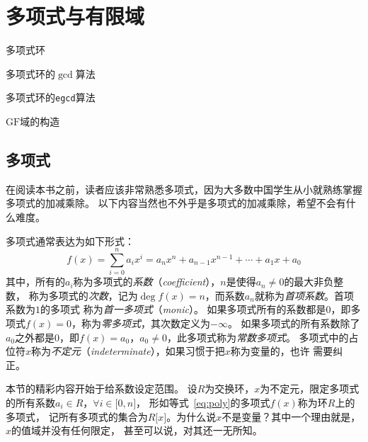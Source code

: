 
\chapter{多项式与有限域}
\label{chap:poly_gf}
\begin{introduction}
  \item 多项式环
  \item 多项式环的$\gcd$算法
  \item 多项式环的\texttt{egcd}算法
  \item $\mathrm{GF}$域的构造
\end{introduction}

\section{多项式}
\label{sec:poly}
在阅读本书之前，读者应该非常熟悉多项式，因为大多数中国学生从小就熟练掌握多项式的加减乘除。
以下内容当然也不外乎是多项式的加减乘除，希望不会有什么难度。

多项式通常表达为如下形式：
\begin{equation}
\label{eq:poly}
f(x) =\sum_{i=0}^n a_i x^i =  a_{n} x^{n} + a_{n-1} x^{n-1} + \cdots + a_1 x + a_0
\end{equation}
其中，所有的$a_i$称为多项式的\emph{系数}（\emph{coefficient}），$n$是使得$a_n \neq 0$的最大非负整数，
称为多项式的\emph{次数}，记为$\deg f(x) =n$，而系数$a_n$就称为\emph{首项系数}。首项系数为$1$的多项式
称为\emph{首一多项式}（\emph{monic}）。
如果多项式所有的系数都是$0$，即多项式$f(x) = 0$，称为\emph{零多项式}，其次数定义为$- \infty$。
如果多项式的所有系数除了$a_0$之外都是$0$，即$f(x) = a_0$，$a_0 \neq 0$，此多项式称为\emph{常数多项式}。
多项式中的占位符$x$称为\emph{不定元}（\emph{indeterminate}），如果习惯于把$x$称为变量的，也许
需要纠正。

本节的精彩内容开始于给系数设定范围。
设$R$为交换环，$x$为不定元，限定多项式的所有系数$a_i \in R$，$\forall i \in  \lbrack 0,n \rbrack$，
形如等式~\ref{eq:poly}的多项式$f(x)$称为环$R$上的多项式，
记所有多项式的集合为$R\lbrack x\rbrack$。为什么说$x$不是变量？其中一个理由就是，$x$的值域并没有任何限定，
甚至可以说，对其还一无所知。

